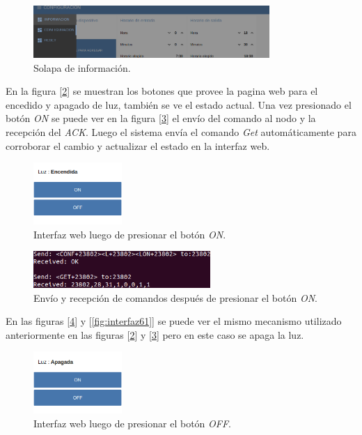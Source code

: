 \begin{figure}[ht!]
	\centering
	\includegraphics[width=0.8\textwidth]{./Figures/interfaz4.png}
	\caption{Solapa de información.}
	\label{fig:interfaz4}
\end{figure}

En la figura [\ref{fig:interfaz52}] se muestran los botones que provee la pagina web para el encedido y apagado de luz, también se ve el estado actual. Una vez presionado el botón {\textit{ON}} se puede ver en la figura [\ref{fig:interfaz51}] el envío del comando al nodo y la recepción del {\textit{ACK}}. Luego el sistema envía el comando {\textit{Get}} automáticamente para corroborar el cambio y actualizar el estado en la interfaz web.

\begin{figure}[h!]
	\centering
	\includegraphics[width=0.3\textwidth]{./Figures/interfaz52.png}
	\caption{Interfaz web luego de presionar el botón {\textit{ON}}.}
	\label{fig:interfaz52}
\end{figure}

\begin{figure}[h!]
	\centering
	\includegraphics[width=0.6\textwidth]{./Figures/interfaz51.png}
	\caption{Envío y recepción de comandos después de presionar el botón {\textit{ON}}.}
	\label{fig:interfaz51}
\end{figure}

En las figuras [\ref{fig:interfaz62}] y [\ref{fig:interfaz61}] se puede ver el mismo mecanismo utilizado anteriormente en las figuras [\ref{fig:interfaz52}] y [\ref{fig:interfaz51}] pero en este caso se apaga la luz.

\begin{figure}[h!]
	\centering
	\includegraphics[width=0.3\textwidth]{./Figures/interfaz62.png}
	\caption{Interfaz web luego de presionar el botón {\textit{OFF}}.}
	\label{fig:interfaz62}
\end{figure}

